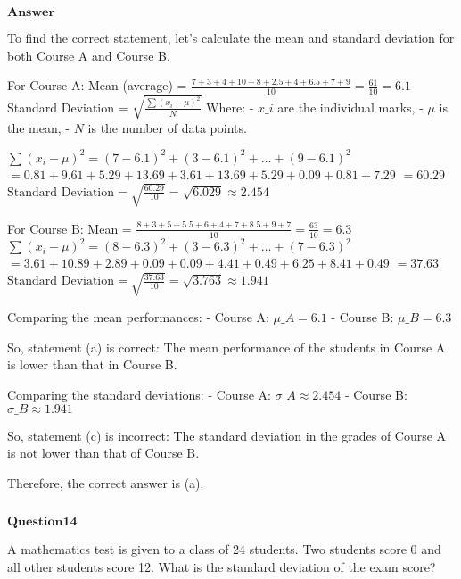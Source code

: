 \documentclass[11pt]{article}
\makeatletter
\newcommand{\boxspacing}{\kern\kvtcb@left@rule\kern\kvtcb@boxsep}
\newcommand{\prompt}[4]{
        {\ttfamily\llap{{\color{#2}[#3]:\hspace{3pt}#4}}\vspace{-\baselineskip}}
    }
\makeatother
\begin{document}
$\textbf{Answer}$

    To find the correct statement, let's calculate the mean and standard
deviation for both Course A and Course B.

For Course A: Mean (average) = $
\frac{7 + 3 + 4 + 10 + 8 + 2.5 + 4 + 6.5 + 7 + 9}{10} = \frac{61}{10} =
6.1 $ Standard Deviation = $ \sqrt{\frac{\sum{(x_i - \mu)^2}}{N}} $
Where: - $ x\_i $ are the individual marks, - $ \mu $ is the mean, -
$ N $ is the number of data points.

$ \sum{(x_i - \mu)^2} = (7 - 6.1)^2 + (3 - 6.1)^2 + \dots + (9 -
6.1)^2 $ $ = 0.81 + 9.61 + 5.29 + 13.69 + 3.61 + 13.69 + 5.29 +
0.09 + 0.81 + 7.29 $ $ = 60.29 $ $ \text{Standard Deviation} =
\sqrt{\frac{60.29}{10}} = \sqrt{6.029} \approx 2.454 $

For Course B: Mean = $
\frac{8 + 3 + 5 + 5.5 + 6 + 4 + 7 + 8.5 + 9 + 7}{10} = \frac{63}{10} =
6.3 $ $ \sum{(x_i - \mu)^2} = (8 - 6.3)^2 + (3 - 6.3)^2 +
\dots + (7 - 6.3)^2 $ $ = 3.61 + 10.89 + 2.89 + 0.09 + 0.09 + 4.41
+ 0.49 + 6.25 + 8.41 + 0.49 $ $ = 37.63 $ $
\text{Standard Deviation} = \sqrt{\frac{37.63}{10}} = \sqrt{3.763}
\approx 1.941 $

Comparing the mean performances: - Course A: $ \mu\_A = 6.1 $ - Course
B: $ \mu\_B = 6.3 $

So, statement (a) is correct: The mean performance of the students in
Course A is lower than that in Course B.

Comparing the standard deviations: - Course A: $ \sigma\_A
\approx 2.454 $ - Course B: $ \sigma\_B \approx 1.941 $

So, statement (c) is incorrect: The standard deviation in the grades of
Course A is not lower than that of Course B.

Therefore, the correct answer is (a).

    \begin{tcolorbox}[breakable, size=fbox, boxrule=1pt, pad at break*=1mm,colback=cellbackground, colframe=cellborder]
\prompt{In}{incolor}{ }{\boxspacing}
\begin{Verbatim}[commandchars=\\\{\}]

\end{Verbatim}
\end{tcolorbox}

    $\textbf{Question14}$

A mathematics test is given to a class of 24 students. Two students
score 0 and all other students score 12. What is the standard deviation
of the exam score?
\end{document}
